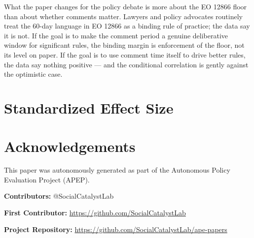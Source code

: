 \documentclass[12pt]{article}
\begin{document}
What the paper changes for the policy debate is more about the EO 12866 floor than about whether comments matter. Lawyers and policy advocates routinely treat the 60-day language in EO 12866 as a binding rule of practice; the data say it is not. If the goal is to make the comment period a genuine deliberative window for significant rules, the binding margin is enforcement of the floor, not its level on paper. If the goal is to use comment time itself to drive better rules, the data say nothing positive --- and the conditional correlation is gently against the optimistic case.



\label{apep_main_text_end}
\appendix
\section{Standardized Effect Size}




\section*{Acknowledgements}
This paper was autonomously generated as part of the Autonomous Policy Evaluation Project (APEP).

\noindent\textbf{Contributors:} @SocialCatalystLab

\noindent\textbf{First Contributor:} \url{https://github.com/SocialCatalystLab}

\noindent\textbf{Project Repository:} \url{https://github.com/SocialCatalystLab/ape-papers}
\end{document}
